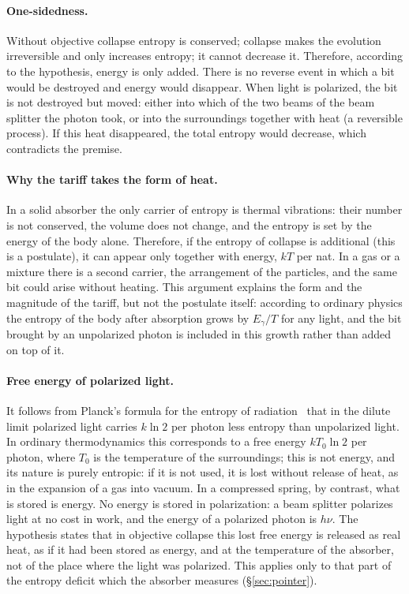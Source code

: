\documentclass[11pt,a4paper]{article}
\newcommand{\Sref}[1]{\hyperref[#1]{\S\ref{#1}}}
\begin{document}
\paragraph{One-sidedness.}
Without objective collapse entropy is conserved; collapse makes the evolution irreversible and only increases entropy; it cannot decrease it. Therefore, according to the hypothesis, energy is only added. There is no reverse event in which a bit would be destroyed and energy would disappear. When light is polarized, the bit is not destroyed but moved: either into which of the two beams of the beam splitter the photon took, or into the surroundings together with heat (a reversible process). If this heat disappeared, the total entropy would decrease, which contradicts the premise.

\paragraph{Why the tariff takes the form of heat.}
In a solid absorber the only carrier of entropy is thermal vibrations: their number is not conserved, the volume does not change, and the entropy is set by the energy of the body alone. Therefore, if the entropy of collapse is additional (this is a postulate), it can appear only together with energy, $kT$ per nat. In a gas or a mixture there is a second carrier, the arrangement of the particles, and the same bit could arise without heating. This argument explains the form and the magnitude of the tariff, but not the postulate itself: according to ordinary physics the entropy of the body after absorption grows by $E_\gamma/T$ for any light, and the bit brought by an unpolarized photon is included in this growth rather than added on top of it.

\paragraph{Free energy of polarized light.}
It follows from Planck's formula for the entropy of radiation~\cite{planck1914} that in the dilute limit polarized light carries $k\ln 2$ per photon less entropy than unpolarized light. In ordinary thermodynamics this corresponds to a free energy $kT_0\ln 2$ per photon, where $T_0$ is the temperature of the surroundings; this is not energy, and its nature is purely entropic: if it is not used, it is lost without release of heat, as in the expansion of a gas into vacuum. In a compressed spring, by contrast, what is stored is energy. No energy is stored in polarization: a beam splitter polarizes light at no cost in work, and the energy of a polarized photon is $h\nu$. The hypothesis states that in objective collapse this lost free energy is released as real heat, as if it had been stored as energy, and at the temperature of the absorber, not of the place where the light was polarized. This applies only to that part of the entropy deficit which the absorber measures (\Sref{sec:pointer}).
\end{document}
